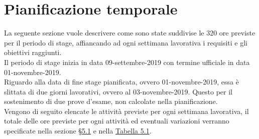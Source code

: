 \section{Pianificazione temporale}

La seguente sezione vuole descrivere come sono state suddivise le 320 ore previste per il periodo di stage, affiancando ad ogni settimana lavorativa i requisiti e gli
 obiettivi raggiunti.\\ Il periodo di stage inizia in data 09-settembre-2019 con termine ufficiale in data 01-novembre-2019.
\\Riguardo alla data di fine stage pianificata, ovvero 01-novembre-2019, essa è slittata di due giorni lavorativi, ovvero al 03-novembre-2019.
Questo per il sostenimento di due prove d'esame, non calcolate nella pianificazione.
\\ Vengono di seguito elencate le attività previste per ogni settimana lavorativa, il totale delle ore previste per ogni attività ed eventuali
 variazioni verranno specificate nella sezione §\hyperref[tempistiche]{5.1} e nella \hyperref[effettive]{Tabella 5.1}.
